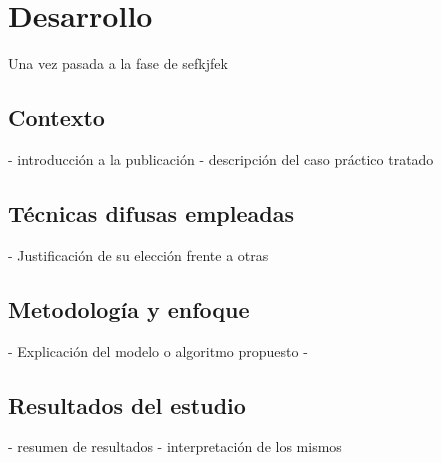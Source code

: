 \section{Desarrollo}

Una vez pasada a la fase de
sefkjfek \parencite{molina2013unifying}

\subsection{Contexto}
- introducción a la publicación
- descripción del caso práctico tratado

\subsection{Técnicas difusas empleadas}
- Justificación de su elección frente a otras

\subsection{Metodología y enfoque}
- Explicación del modelo o algoritmo propuesto
- 

\subsection{Resultados del estudio}
- resumen de resultados
- interpretación de los mismos
